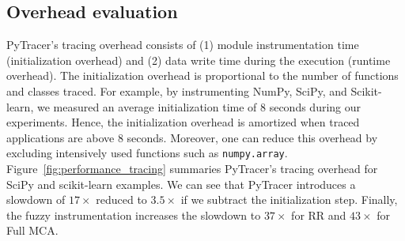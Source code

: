 \documentclass[11pt]{article}
\newcommand{\tristan}[1]{\color{orange}\textbf{From Tristan:} #1\color{black}\xspace}
\newcommand{\pytracer}[0]{PyTracer\xspace}
\begin{document}


\subsection{Overhead evaluation}
\pytracer's tracing overhead consists of (1) module instrumentation time (initialization overhead) and (2) data write time during the execution (runtime overhead). The initialization overhead is proportional to the number of functions and classes traced. For example, by instrumenting NumPy, SciPy, and Scikit-learn, we measured an average initialization time of 8 seconds during our experiments. Hence, the initialization overhead is amortized when traced applications are above 8 seconds. Moreover, one can reduce this overhead by excluding intensively used functions such as \texttt{numpy.array}.
Figure~\ref{fig:performance_tracing} summaries \pytracer's tracing overhead for SciPy and scikit-learn examples. We can see that \pytracer introduces a slowdown of $17\times$ reduced to $3.5\times$ if we subtract the initialization step. Finally, the fuzzy instrumentation increases the slowdown to  $37\times$ for RR and $43\times$ for Full MCA.

\end{document}
